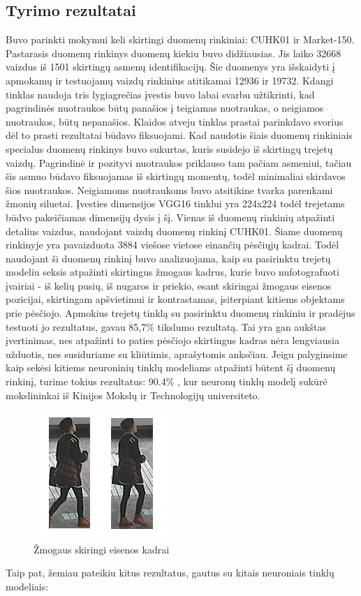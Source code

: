 \documentclass{VUMIFPSkursinis}
\DeclareRobustCommand{\[}{\begin{equation}}
\DeclareRobustCommand{\]}{\end{equation}}
\begin{document}
\subsection{Tyrimo rezultatai}
Buvo parinkti mokymui keli skirtingi duomenų rinkiniai: CUHK01 ir  Market-150. Pastarasis duomenų rinkinys duomenų kiekiu buvo didžiausias. Jis laiko 32668 vaizdus iš 1501 skirtingų asmenų identifikacijų. Šie duomenys yra išskaidyti  į apmokamų ir testuojamų vaizdų rinkinius atitikamai 12936 ir 19732.
Kdangi tinklas naudoja tris lygiagrečias įvestis buvo labai svarbu užtikrinti, kad pagrindinės nuotraukos būtų panašios į teigiamas nuotraukas, o neigiamos nuotraukos, būtų nepanašios. Klaidos atveju tinklas prastai parinkdavo svorius dėl to prasti rezultatai būdavo fiksuojami.
Kad naudotis šiais duomenų rinkiniais specialus duomenų rinkinys buvo sukurtas, kuris susidejo iš skirtingų trejetų vaizdų. Pagrindinė ir pozityvi nuotraukos priklauso tam pačiam asmeniui, tačiau šis asmuo būdavo fiksuojamas iš skirtingų momentų, todėl minimaliai skirdavos šios nuotraukos. Neigiamoms nuotraukoms buvo atsitikine tvarka parenkami žmonių siluetai. Įvesties dimensijos VGG16 tinklui yra 224x224 todėl trejetams būdvo pakeičiamas dimensijų dysis į šį.
Vienas iš duomenų rinkinių atpažinti detalius vaizdus, naudojant vaizdų duomenų rinkinį CUHK01. Šiame duomenų rinkinyje yra pavaizduota 3884 viešose vietose einančių pėsčiųjų kadrai. Todėl naudojant ši duomenų rinkinį buvo analizuojama, kaip su pasirinktu trejetų modeliu seksis atpažinti skirtingus žmogaus kadrus, kurie buvo nufotografuoti įvairiai -  iš kelių pusių, iš nugaros ir priekio, esant skiringai žmogaus eisenos pozicijai, skirtingam apšvietimui ir kontrastamas, įsiterpiant kitiems objektams prie pėsčiojo.
\newline
Apmokius trejetų tinklą su pasirinktu duomenų rinkiniu ir pradėjus testuoti jo rezultatus, gavau 85,7\% tikslumo rezultatą. Tai yra gan aukštas įvertinimas, nes atpažinti to paties pėsčiojo skirtingus kadras nėra lengviausia užduotis, nes susiduriame su kliūtimis, aprašytomis anksčiau. Jeigu palyginsime kaip sekėsi kitiems neuroninių tinklų modeliams atpažinti būtent šį duomenų rinkinį, turime tokius rezultatus:
90.4\% , kur neuronų tinklų modelį sukūrė mokslininkai iš Kinijos Mokslų ir Technologijų universiteto. \cite{Person_reindentification}
\begin{figure}[H]
\centering
\includegraphics[scale=1.0]{img/Frame_diff.png}
\caption{Žmogaus skiringi eisenos kadrai} %
\label{img:mlp}
\end{figure}
Taip pat, žemiau pateikiu kitus rezultatus, gautus su kitais neuroniais tinklų modeliais:
\end{document}
